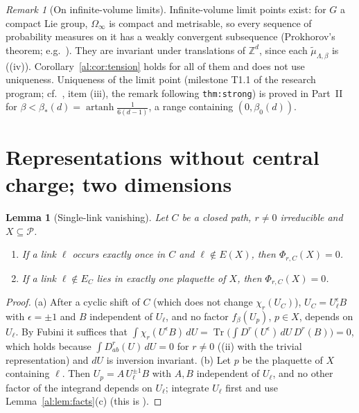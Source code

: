 \documentclass[11pt,a4paper]{article}
\newtheorem{lemma}[theorem]{Lemma}
\theoremstyle{definition}
\theoremstyle{remark}
\newtheorem{remark}[theorem]{Remark}
\DeclareMathOperator{\Tr}{Tr}
\DeclareMathOperator{\artanh}{artanh}
\newcommand{\Z}{\mathbb{Z}}
\newcommand{\cP}{\mathcal{P}}
\newcommand{\dU}{\,dU}
\newcommand{\Fref}[3]{\cite[#1~`#2' (\texttt{#3})]{F}}
\newcommand{\Flab}[2]{\cite[#1 \texttt{#2}]{F}}
\newcommand{\Fname}[2]{\cite[#1~`#2']{F}}
\begin{document}
\begin{remark}[On infinite-volume limits]\label{al:rem:limits}
Infinite-volume limit points exist: for $G$ a compact Lie group, $\Omega_\infty$ is compact and metrisable, so every
sequence of probability measures on it has a weakly convergent subsequence (Prokhorov's theorem; e.g.\
\cite[Section~5]{Bil99}). They are invariant under translations of $\Z^d$, since each $\tilde\mu_{\Lambda,\beta}$ is
(\Fref{Theorem}{Basic properties}{thm:basic}(iv)). Corollary~\ref{al:cor:tension} holds for all of them and does not use
uniqueness. Uniqueness of the limit point (milestone T1.1 of the research program; cf.\ \Fname{Remark}{On the constants and on
what this proves}, item (iii), the remark following \texttt{thm:strong}) is proved in Part~II \cite{II} for
$\beta<\beta_*(d)=\artanh\frac1{6(d-1)}$, a range containing $(0,\beta_0(d))$.
\end{remark}

\section{Representations without central charge; two dimensions}\label{al:sec:other}

\begin{lemma}[Single-link vanishing]\label{al:lem:singlelink}
Let $C$ be a closed path, $r\neq0$ irreducible and $X\subseteq\cP$.
\begin{enumerate}[label=(\alph*)]
\item If a link $\ell$ occurs exactly once in $C$ and $\ell\notin E(X)$, then $\Phi_{r,C}(X)=0$.
\item If a link $\ell\notin E_C$ lies in exactly one plaquette of $X$, then $\Phi_{r,C}(X)=0$.
\end{enumerate}
\end{lemma}

\begin{proof}
(a) After a cyclic shift of $C$ (which does not change $\chi_r(U_C)$), $U_C=U_\ell^{\epsilon}B$ with $\epsilon=\pm1$ and $B$
independent of $U_\ell$, and no factor $f_\beta(U_p)$, $p\in X$, depends on $U_\ell$. By Fubini it suffices that
$\int\chi_r(U^\epsilon B)\dU=\Tr\bigl(\int D^r(U^{\epsilon})\dU\,D^r(B)\bigr)=0$, which holds because $\int D^r_{ab}(U)\dU=0$
for $r\neq0$ (\Flab{Cited Theorem}{thm:pw}(ii) with the trivial representation) and $dU$ is inversion invariant.
(b) Let $p$ be the plaquette of $X$ containing $\ell$. Then $U_p=A\,U_\ell^{\pm1}B$ with $A,B$ independent of $U_\ell$, and no
other factor of the integrand depends on $U_\ell$; integrate $U_\ell$ first and use Lemma~\ref{al:lem:facts}(c) (this is
\Fref{Lemma}{Closed surfaces}{lem:closed}).
\end{proof}
\end{document}
